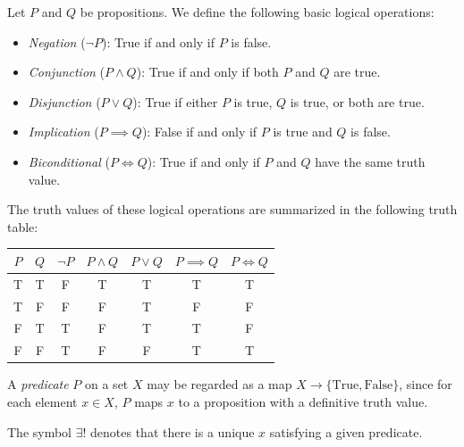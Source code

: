 \documentclass[../ium.tex]{subfiles}
\begin{document}
\begin{definition}
\begin{shaded*}
Let $P$ and $Q$ be propositions. We define the following basic logical operations:
\begin{itemize}
    \item \textit{Negation} ($\neg P$): True if and only if $P$ is false.
    \item \textit{Conjunction} ($P \land Q$): True if and only if both $P$ and $Q$ are true.
    \item \textit{Disjunction} ($P \lor Q$): True if either $P$ is true, $Q$ is true, or both are true.
    \item \textit{Implication} ($P \implies Q$): False if and only if $P$ is true and $Q$ is false.
    \item \textit{Biconditional} ($P \iff Q$): True if and only if $P$ and $Q$ have the same truth value.
\end{itemize}
\end{shaded*}
\end{definition}

\begin{remark}
The truth values of these logical operations are summarized in the following truth table:
\begin{center}
\begin{tabular}{cc|ccccc}
$P$ & $Q$ & $\neg P$ & $P \land Q$ & $P \lor Q$ & $P \implies Q$ & $P \iff Q$ \\
\hline
T & T & F & T & T & T & T \\
T & F & F & F & T & F & F \\
F & T & T & F & T & T & F \\
F & F & T & F & F & T & T
\end{tabular}
\end{center}
\end{remark}

\begin{definition}
\begin{shaded*}
A \textit{predicate} $P$ on a set $X$ may be regarded as a map $X \to \{\mathrm{True}, \mathrm{False}\}$, since for each element $x \in X$, $P$ maps $x$ to a proposition with a definitive truth value.
\end{shaded*}
\end{definition}

\begin{remark}
The symbol $\exists!$ denotes that there is a unique $x$ satisfying a given predicate.
\end{remark}
\end{document}
